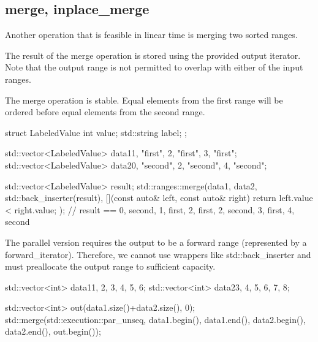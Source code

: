 \subsection{merge, inplace\_merge}

Another operation that is feasible in linear time is merging two sorted ranges.



The result of the merge operation is stored using the provided output iterator. Note that the output range is not permitted to overlap with either of the input ranges.

The merge operation is stable. Equal elements from the first range will be ordered before equal elements from the second range.

\begin{box-note}
\begin{cppcode}
struct LabeledValue {
    int value;
    std::string label;
};

std::vector<LabeledValue> data1{{1, "first"}, {2, "first"}, {3, "first"}};
std::vector<LabeledValue> data2{{0, "second"}, {2, "second"}, {4, "second"}};

std::vector<LabeledValue> result;
std::ranges::merge(data1, data2, std::back_inserter(result),
  [](const auto& left, const auto& right) { return left.value < right.value; });
// result == {0, second}, {1, first}, {2, first}, {2, second}, {3, first}, {4, second}
\end{cppcode}
\end{box-note}

The parallel version requires the output to be a forward range (represented by a forward\_iterator). Therefore, we cannot use wrappers like std::back\_inserter and must preallocate the output range to sufficient capacity.

\begin{box-note}
\begin{cppcode}
std::vector<int> data1{1, 2, 3, 4, 5, 6};
std::vector<int> data2{3, 4, 5, 6, 7, 8};

std::vector<int> out(data1.size()+data2.size(), 0);
std::merge(std::execution::par_unseq,
    data1.begin(), data1.end(),
    data2.begin(), data2.end(),
    out.begin());
\end{cppcode}
\end{box-note}

